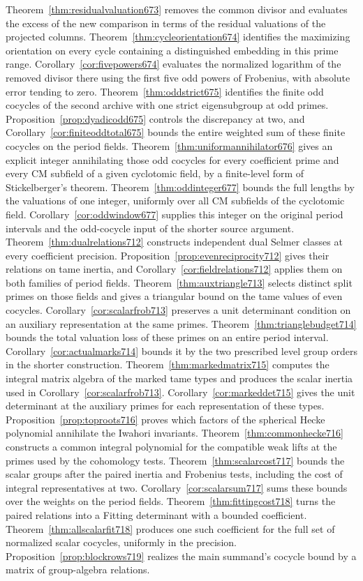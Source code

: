 \documentclass[a4paper,11pt]{article}
\theoremstyle{definition}
\theoremstyle{remark}
\numberwithin{equation}{section}
\begin{document}
Theorem~\ref{thm:residualvaluation673} removes the common divisor and evaluates the excess of the new comparison in terms of the residual valuations of the projected columns. Theorem~\ref{thm:cycleorientation674} identifies the maximizing orientation on every cycle containing a distinguished embedding in this prime range. Corollary~\ref{cor:fivepowers674} evaluates the normalized logarithm of the removed divisor there using the first five odd powers of Frobenius, with absolute error tending to zero. Theorem~\ref{thm:oddstrict675} identifies the finite odd cocycles of the second archive with one strict eigensubgroup at odd primes. Proposition~\ref{prop:dyadicodd675} controls the discrepancy at two, and Corollary~\ref{cor:finiteoddtotal675} bounds the entire weighted sum of these finite cocycles on the period fields. Theorem~\ref{thm:uniformannihilator676} gives an explicit integer annihilating those odd cocycles for every coefficient prime and every CM subfield of a given cyclotomic field, by a finite-level form of Stickelberger's theorem. Theorem~\ref{thm:oddinteger677} bounds the full lengths by the valuations of one integer, uniformly over all CM subfields of the cyclotomic field. Corollary~\ref{cor:oddwindow677} supplies this integer on the original period intervals and the odd-cocycle input of the shorter source argument. Theorem~\ref{thm:dualrelations712} constructs independent dual Selmer classes at every coefficient precision. Proposition~\ref{prop:evenreciprocity712} gives their relations on tame inertia, and Corollary~\ref{cor:fieldrelations712} applies them on both families of period fields. Theorem~\ref{thm:auxtriangle713} selects distinct split primes on those fields and gives a triangular bound on the tame values of even cocycles. Corollary~\ref{cor:scalarfrob713} preserves a unit determinant condition on an auxiliary representation at the same primes. Theorem~\ref{thm:trianglebudget714} bounds the total valuation loss of these primes on an entire period interval. Corollary~\ref{cor:actualmarks714} bounds it by the two prescribed level group orders in the shorter construction. Theorem~\ref{thm:markedmatrix715} computes the integral matrix algebra of the marked tame types and produces the scalar inertia used in Corollary~\ref{cor:scalarfrob713}. Corollary~\ref{cor:markeddet715} gives the unit determinant at the auxiliary primes for each representation of these types. Proposition~\ref{prop:toproots716} proves which factors of the spherical Hecke polynomial annihilate the Iwahori invariants. Theorem~\ref{thm:commonhecke716} constructs a common integral polynomial for the compatible weak lifts at the primes used by the cohomology tests. Theorem~\ref{thm:scalarcost717} bounds the scalar groups after the paired inertia and Frobenius tests, including the cost of integral representatives at two. Corollary~\ref{cor:scalarsum717} sums these bounds over the weights on the period fields. Theorem~\ref{thm:fittingcost718} turns the paired relations into a Fitting determinant with a bounded coefficient. Theorem~\ref{thm:allscalarfit718} produces one such coefficient for the full set of normalized scalar cocycles, uniformly in the precision. Proposition~\ref{prop:blockrows719} realizes the main summand's cocycle bound by a matrix of group-algebra relations. 
\end{document}

